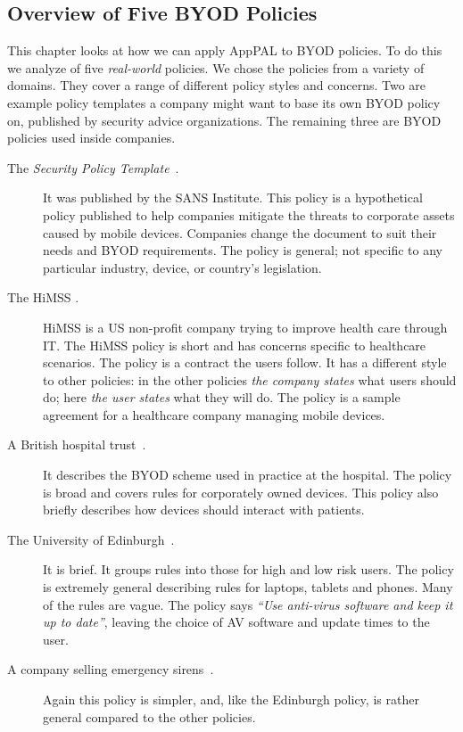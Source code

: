 \documentclass[thesis.tex]{subfiles}
\begin{document}
\subsection{Overview of Five BYOD Policies}
\label{sec:overview-of-five-byod-policies}

This chapter looks at how we can apply AppPAL to
BYOD policies.  To do this we analyze of five \emph{real-world} policies.
We chose the policies from a variety of domains.  They cover a range
of different policy styles and concerns.  Two are example policy
templates a company might want to base its own BYOD policy on,
published by security advice organizations.  The remaining three are
BYOD policies used inside companies.

\begin{description}
  \item[The \emph{Security Policy Template}~\cite{nicholas_r._c._guerin_security_2008}.] It was published by the SANS
  Institute. This policy is a
  hypothetical policy published to help companies mitigate the threats
  to corporate assets caused by mobile devices. Companies change the
  document to suit their needs and BYOD requirements. The policy is
  general; not specific to any particular industry, device, or country's
  legislation.
\item[The \acl{HiMSS}
  \cite{healthcare_information_and_management_systems_society_mobile_2012}.]
  \acs{HiMSS} is a US non-profit company trying to improve health care through IT.
  The \ac{HiMSS} policy is short and has concerns specific to
  healthcare scenarios. The policy is a contract the users follow. It has
  a different style to other policies: in the other policies \emph{the company states}
  what users should do; here \emph{the user states} what they will do. The policy is
  a sample agreement for a healthcare company managing mobile
  devices.
\item[A British hospital trust~\cite{kennington_mobiles_2014}.]
  It describes the BYOD scheme used in practice at the hospital.  The
  policy is broad and covers rules for corporately owned devices.  This
  policy also briefly describes how devices should interact with
  patients.
\item[The University of
  Edinburgh~\cite{williamson_bring_2015}.] It is brief. It groups
  rules into those for high and low risk users.  The policy is extremely general describing rules for
  laptops, tablets and phones.  Many of the rules are vague.
  The policy says \emph{``Use anti-virus software and keep it up
    to date''}, leaving the choice of AV software and
  update times to the user.
\item[A company selling emergency
  sirens~\cite{code3pse.org_sample_nodate}.] Again this policy is simpler,
  and, like the Edinburgh policy, is rather general compared to the other policies.
\end{description}
\end{document}
